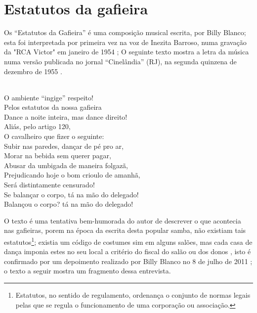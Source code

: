 \section{Estatutos da gafieira}
Os ``Estatutos da Gafieira'' é uma composição musical escrita, por Billy Blanco;
esta foi interpretada por primeira vez na voz de Inezita Barroso, 
numa gravação da "RCA Victor" em janeiro de 1954 \cite{musicaestatuto};
O seguinte texto mostra a letra da música numa 
versão publicada no jornal ``Cinelândia''  (RJ),
na segunda quinzena de dezembro de 1955 \cite[pp. 95]{musicaestatutojournal1955}.
\begin{citando}%
\\
O ambiente ``ingige'' respeito!\\
Pelos estatutos da nossa gafieira\\
Dance a noite inteira, mas dance direito!\\
Aliás, pelo artigo 120,\\
O cavalheiro que fizer o seguinte:\\
Subir nas paredes, dançar de pé pro ar,\\
Morar na bebida sem querer pagar,\\
Abusar da umbigada de maneira folgazã,\\
Prejudicando hoje o bom crioulo de amanhã,\\
Será distintamente censurado!\\
Se balançar o corpo, tá na mão do delegado!\\
Balançou o corpo? tá na mão do delegado!\\
\end{citando}
O texto é uma tentativa bem-humorada do autor de descrever o que acontecia 
nas gafieiras, porem na época da escrita desta popular samba, não
existiam tais estatutos\footnote{Estatutos, no sentido de regulamento, 
ordenança o conjunto de normas legais pelas que se regula o funcionamento de uma corporação ou associação.};
existia um código de costumes sim \cite[pp. 13]{respeitojournalbrasil1} em alguns salões, 
mas cada casa de dança imponia estes no seu local a critério do fiscal do salão ou dos 
donos \cite[pp. 10]{simoesjournalbrasil1} \cite[pp. 6 - cad. B]{entrevistajuliojournalbrasil1} \cite[pp. 37]{gafieirajournalmanchete},
isto é confirmado por um depoimento realizado por 
Billy Blanco no 8 de julho de 2011 \cite[pp. 56]{depoimentobilly}; o texto a seguir
mostra um fragmento dessa entrevista.

